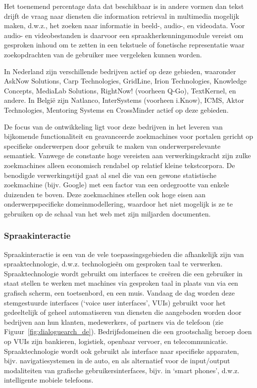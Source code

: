 \begin{multicols}{2}
Het toenemend percentage data dat beschikbaar is in andere vormen dan tekst drijft de vraag naar diensten die information retrieval in multimedia mogelijk maken, d.w.z., het zoeken naar informatie in beeld-, audio-, en videodata. Voor audio- en videobestanden is daarvoor een spraakherkenningsmodule vereist om gesproken inhoud om te zetten in een tekstuele of fonetische representatie waar zoekopdrachten van de gebruiker mee vergeleken kunnen worden.

    In Nederland zijn verschillende bedrijven actief op deze gebieden, waaronder AskNow Solutions, Carp Technologies, GridLine, Irion Technologies, Knowledge Concepts, MediaLab Solutions, RightNow! (voorheen Q-Go), TextKernel, en andere. In Belgi{\"e} zijn Natlanco, InterSystems (voorheen i.Know), ICMS, Aktor Technologies, Mentoring Systems en CrossMinder actief op deze gebieden.

    De focus van de ontwikkeling ligt voor deze bedrijven in het leveren van bijkomende functionaliteit en geavanceerde zoekmachines voor portalen gericht op specifieke onderwerpen door gebruik te maken van onderwerpsrelevante semantiek. Vanwege de constante hoge vereisten aan verwerkingskracht zijn zulke zoekmachines alleen economisch rendabel op relatief kleine tekstcorpora. De benodigde verwerkingstijd gaat al snel die van een gewone statistische zoekmachine (bijv. Google) met een factor van een ordegrootte van enkele duizenden te boven. Deze zoekmachines stellen ook hoge eisen aan onderwerpspecifieke domeinmodellering, waardoor het niet mogelijk is ze te gebruiken op de schaal van het web met zijn miljarden documenten.

\subsubsection{Spraakinteractie}

  Spraakinteractie is een van de vele toepassingsgebieden die afhankelijk zijn van spraaktechnologie, d.w.z. technologie{\"e}n om gesproken taal te verwerken. Spraaktechnologie wordt gebruikt om interfaces te cre{\"e}ren die een gebruiker in staat stellen te werken met machines via gesproken taal in plaats van via een grafisch scherm, een toetsenbord, en een muis. Vandaag de dag worden deze stemgestuurde interfaces (`voice user interfaces', VUIs) gebruikt voor het gedeeltelijk of geheel automatiseren van diensten die aangeboden worden door bedrijven aan hun klanten, medewerkers, of partners via de telefoon (zie Figuur~\ref{fig:dialoguearch_de}). Bedrijfsdomeinen die een grootschalig beroep doen op VUIs zijn bankieren, logistiek, openbaar vervoer, en telecommunicatie. Spraaktechnologie wordt ook gebruikt als interface naar specifieke apparaten, bijv. navigatiesystemen in de auto, en als alternatief voor de input/output modaliteiten van grafische  gebruikersinterfaces, bijv.  in `smart phones', d.w.z. intelligente mobiele telefoons.


\end{multicols}
